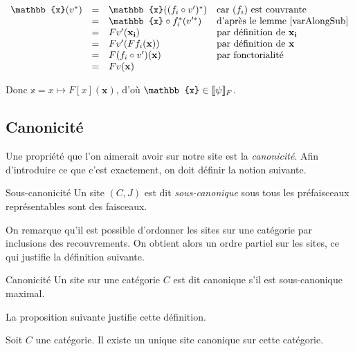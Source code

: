 \begin{pv}
    \[\begin{array}{rcll}
        \mathbb{x}(v^*) & = & \mathbb{x}((f_i\circ v')^*)
                                & \text{car $(f_i)$ est couvrante} \\
                        & = & \mathbb{x}\circ f_i^*(v'^*)
                                & \text{d'après le lemme \ref{varAlongSub}} \\
                        & = & Fv'(\mathbf{x_i})
                                & \text{par définition de }\mathbf{x_i}\\
                        & = & Fv'(Ff_i(\mathbf{x}))
                                & \text{par définition de }\mathbf{x} \\
                        & = & F(f_i\circ v')(\mathbf{x})
                                & \text{par fonctorialité} \\
                        & = & Fv(\mathbf{x}) & \\
    \end{array}\]

    Donc $\mathbb{x} = x\mapsto F[x](\mathbf{x})$, d'où $\mathbb{x}\in\sem{\psi}_F$.
\end{pv}

\subsection{Canonicité}

Une propriété que l'on aimerait avoir sur notre site est la \emph{canonicité}. Afin
d'introduire ce que c'est exactement, on doit définir la notion suivante.

\begin{defi}{Sous-canonicité}
    Un site $(C,J)$ est dit \emph{sous-canonique} sous tous les préfaisceaux
    représentables sont des faisceaux.
\end{defi}

On remarque qu'il est possible d'ordonner les sites sur une catégorie par inclusions
des recouvrements. On obtient alors un ordre partiel sur les sites, ce qui justifie
la définition suivante.

\begin{defi}{Canonicité}
    Un site sur une catégorie $C$ est dit canonique s'il est sous-canonique maximal.
\end{defi}

La proposition suivante justifie cette définition.

\begin{prop}
    Soit $C$ une catégorie. Il existe un unique site canonique sur cette catégorie.
\end{prop}

